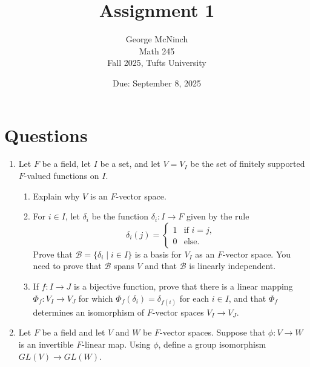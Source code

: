 \documentclass{article}
\title{Assignment 1}
\author{George McNinch \\ Math 245 \\ Fall 2025, Tufts University}
\date{Due: September 8, 2025}
\begin{document}
\maketitle

\section*{Questions}

\begin{enumerate}

\item Let $ F $ be a field, let $ I $ be a set, and let $ V = V_I $ be the set of finitely supported $ F $-valued functions on $ I $.
\begin{enumerate}
    \item Explain why $ V $ is an $ F $-vector space.
    \item For $ i \in I $, let $ \delta_i $ be the function $ \delta_i: I \to F $ given by the rule 
    $$\delta_i(j) =      \begin{cases}         1 & \text{if } i = j, \\         0 & \text{else.}     \end{cases}$$
    Prove that $ \mathcal{B} = \{ \delta_i \mid i \in I \} $ is a basis for $ V_I $ as an $ F $-vector space. You need to prove that $ \mathcal{B} $ spans $ V $ and that $ \mathcal{B} $ is linearly independent.
    \item If $ f: I \to J $ is a bijective function, prove that there is a linear mapping $ \Phi_f: V_I \to V_J $ for which $ \Phi_f(\delta_i) = \delta_{f(i)} $ for each $ i \in I $, and that $ \Phi_f $ determines an isomorphism of $ F $-vector spaces $ V_I \to V_J $.
\end{enumerate}

\item Let $ F $ be a field and let $ V $ and $ W $ be $ F $-vector spaces. Suppose that $ \phi: V \to W $ is an invertible $ F $-linear map. Using $ \phi $, define a group isomorphism $ GL(V) \to GL(W) $.

\end{enumerate}
\end{document}
